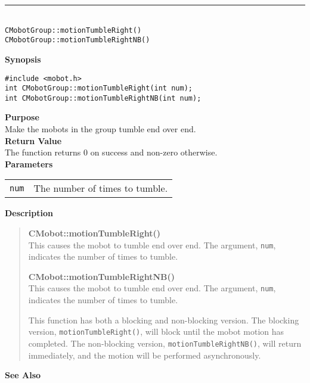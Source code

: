 \noindent
\vspace{5pt}
\rule{4.5in}{0.015in}\\
\noindent
{\LARGE \texttt{CMobotGroup::motionTumbleRight()}}\\
{\LARGE \texttt{CMobotGroup::motionTumbleRightNB()}}\\
{}

\noindent
{\bf Synopsis}
\vspace{-8pt}
\begin{verbatim}
#include <mobot.h>
int CMobotGroup::motionTumbleRight(int num);
int CMobotGroup::motionTumbleRightNB(int num);
\end{verbatim}

\noindent
{\bf Purpose}\\
Make the mobots in the group tumble end over end.\\

\noindent
{\bf Return Value}\\
The function returns 0 on success and non-zero otherwise.\\

\noindent
{\bf Parameters}\\
\vspace{-0.1in}
\begin{description}
\item               
\begin{tabular}{p{10 mm}p{145 mm}}
\texttt{num} & The number of times to tumble. \\
\end{tabular}
\end{description}

\noindent
{\bf Description}\\
\vspace{-12pt}
\begin{quote}
{\bf CMobot::motionTumbleRight()}\\
This causes the mobot to tumble end over end. The argument, \texttt{num},
indicates the number of times to tumble.

{\bf CMobot::motionTumbleRightNB()}\\
This causes the mobot to tumble end over end. The argument, \texttt{num},
indicates the number of times to tumble.

This function has both a blocking and non-blocking version.
The blocking version, \texttt{motionTumbleRight()}, will block until the
mobot motion has completed. The non-blocking version, \texttt{motionTumbleRightNB()},
will return immediately, and the motion will be performed asynchronously.\\
\end{quote}

\noindent
{\bf See Also}\\


